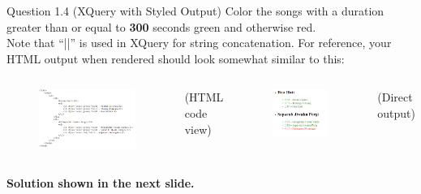 \begin{frame}[fragile]{Question 1.4 (XQuery with Styled Output)}
Color the songs with a duration greater than or equal to \textcolor{red}{} \textbf{300} seconds green and otherwise red.\\\vspace{5pt}
Note that ``||'' is used in XQuery for string concatenation. For reference, your HTML output when rendered should look somewhat similar to this: \\\vspace{0pt}

\begin{columns}
	\begin{figure}
		\includegraphics[width=1\textwidth,frame]{4221-t8/q4-output.png}
	\end{figure}\vspace{-5pt}
	(HTML code view)
	\begin{figure}
		\includegraphics[width=1\textwidth,frame]{4221-t8/q4-output-direct.png}
	\end{figure}\vspace{-5pt}
	(Direct output)
\end{columns}
\vspace{5pt}
\textbf{Solution shown in the next slide.}
\end{frame}
	
